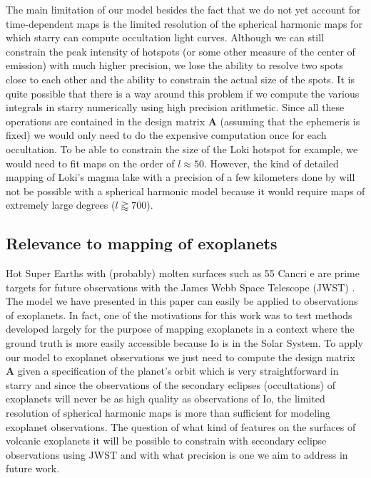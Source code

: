 \documentclass[modern]{aastex62}
\begin{document}
The main limitation of our model besides the fact that we do not yet account for time-dependent maps is the limited resolution of the spherical harmonic maps for which \textsf{starry} can compute occultation light curves.
Although we can still constrain the peak intensity of hotspots (or some other measure of the center of emission) with much higher precision, we lose the ability to resolve two spots close to each other and the ability to constrain the actual size of the spots. 
It is quite possible that there is a way around this problem if we compute the various integrals in \textsf{starry} numerically using high precision arithmetic.
Since all these operations are contained in the design matrix $\mathbf{A}$ (assuming that the ephemeris is fixed) we would only need to do the expensive computation once for each occultation.
To be able to constrain the size of the Loki hotspot for example, we would need to fit maps on the order of $l\approx 50$.
However, the kind of detailed mapping of Loki's magma lake with a precision of a few kilometers done by \cite{dekleer2017} will not be possible with a spherical harmonic model because it would require maps of extremely large degrees ($l\gtrapprox 700$).

\subsection{Relevance to mapping of exoplanets} 
\label{ssec:discussion_exoplanets}
Hot Super Earths with (probably) molten surfaces such as 55 Cancri e are prime targets for future observations with the James Webb Space Telescope (JWST) \citep{samuel2014,henning2018}.
The model we have presented in this paper can easily be applied to observations of exoplanets. 
In fact, one of the motivations for this work was to test methods developed largely for the purpose of mapping exoplanets in a context where the ground truth is more easily accessible because Io is in the Solar System.
To apply our model to exoplanet observations we just need to compute the design matrix $\mathbf{A}$ given a specification of the planet's orbit which is very straightforward in \textsf{starry}
and since the observations of the secondary eclipses (occultations) of exoplanets will never be as high quality as observations of Io, the limited resolution of spherical harmonic maps is more than sufficient for modeling exoplanet observations.
The question of what kind of features on the surfaces of volcanic exoplanets it will be possible to constrain with secondary eclipse observations using JWST and with what precision is one we aim to address in future work.
\end{document}
